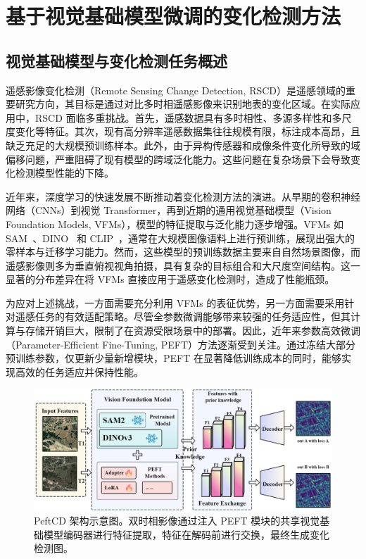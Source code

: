\section{基于视觉基础模型微调的变化检测方法}

\subsection{视觉基础模型与变化检测任务概述}

遥感影像变化检测（Remote Sensing Change Detection, RSCD）是遥感领域的重要研究方向，其目标是通过对比多时相遥感影像来识别地表的变化区域。在实际应用中，RSCD 面临多重挑战。首先，遥感数据具有多时相性、多源多样性和多尺度变化等特征。其次，现有高分辨率遥感数据集往往规模有限，标注成本高昂，且缺乏充足的大规模预训练样本。此外，由于异构传感器和成像条件变化所导致的域偏移问题，严重阻碍了现有模型的跨域泛化能力。这些问题在复杂场景下会导致变化检测模型性能的下降。

近年来，深度学习的快速发展不断推动着变化检测方法的演进。从早期的卷积神经网络（CNNs）到视觉 Transformer，再到近期的通用视觉基础模型（Vision Foundation Models, VFMs），模型的特征提取与泛化能力逐步增强。VFMs 如 SAM~\cite{Kirillov2023SegmentA}、DINO~\cite{Caron2021EmergingPI,simeoni2025dinov3} 和 CLIP~\cite{Radford2021LearningTV}，通常在大规模图像语料上进行预训练，展现出强大的零样本与迁移学习能力。然而，这些模型的预训练数据主要来自自然场景图像，而遥感影像则多为垂直俯视视角拍摄，具有复杂的目标组合和大尺度空间结构。这一显著的分布差异在将 VFMs 直接应用于遥感变化检测时，造成了性能瓶颈。

为应对上述挑战，一方面需要充分利用 VFMs 的表征优势，另一方面需要采用针对遥感任务的有效适配策略。尽管全参数微调能够带来较强的任务适应性，但其计算与存储开销巨大，限制了在资源受限场景中的部署。因此，近年来参数高效微调（Parameter-Efficient Fine-Tuning, PEFT）方法逐渐受到关注。通过冻结大部分预训练参数，仅更新少量新增模块，PEFT 在显著降低训练成本的同时，能够实现高效的任务适应并保持性能。

\begin{figure}[!htbp]
  \centering
  \includegraphics[width=\textwidth]{paper_figures/基于AI基础模型微调的变化检测模型研究/PeftCD/peftcd_framework.png}
  \caption{PeftCD 架构示意图。双时相影像通过注入 PEFT 模块的共享视觉基础模型编码器进行特征提取，特征在解码前进行交换，最终生成变化检测图。}
  \label{fig:peftcd_framework}
\end{figure}

